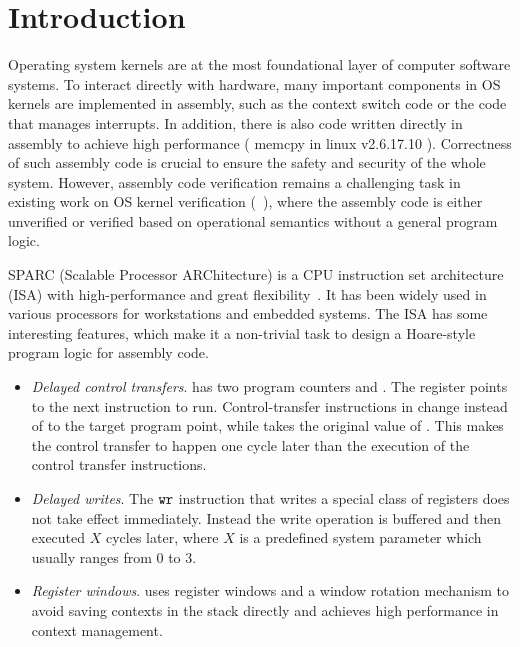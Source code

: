 \section{Introduction}

Operating system kernels are at
the most foundational layer of computer software systems.
To interact directly with hardware,
many important components in OS kernels are implemented
in assembly, such as the context switch code or the code that
manages interrupts.
In addition, there is also code written directly in assembly
to achieve high performance (\eg{} \textsf{memcpy} in linux
v2.6.17.10 \cite{linuxv2.6.17.10}).
Correctness of such assembly code is crucial to ensure
the safety and security of the whole system.
However, assembly code verification remains a challenging
task in existing work on OS kernel verification
(\eg~\cite{Xu16cav, sel4, deepspec}),
where the assembly code is either unverified or verified based on
operational semantics without a general program logic.

SPARC (Scalable Processor ARChitecture)
is a CPU instruction set architecture (ISA) with high-performance
and great flexibility~\cite{sparc}.
It has been widely used in various processors
for workstations and embedded systems. %
The \sparc{} ISA has some interesting features, which
make it a non-trivial task to design a Hoare-style
program logic for assembly code.

\begin{itemize}
	\item \textit{Delayed control transfers}.
	\sparc{} has two program counters \pc{} and \npc.
    The \npc{} register points to the next instruction
    to run.
	Control-transfer instructions in \sparc{}
	change \npc{} instead of \pc{} to the target program point,
    while \pc{} takes the original value of \npc.
	This makes the control transfer to happen one cycle later
    than the execution of the control transfer instructions.
	
	\item \textit{Delayed writes}.
	The $\texttt{wr}$ instruction that writes a special class
    of registers
    does not take effect immediately.
    Instead the write operation is buffered
    and then executed $X$ cycles later, where $X$ is a
    predefined
    system parameter which usually ranges from 0 to 3.
	\item \textit{Register windows}.
	\sparc{} uses register windows
	and a window rotation mechanism
	to avoid saving contexts in the stack directly
	and achieves high performance in context management.
\end{itemize}

